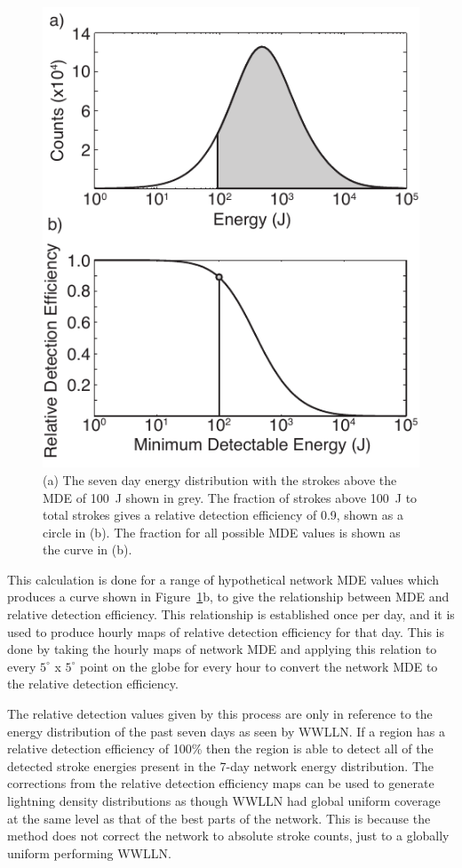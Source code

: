 \begin{figure}[ht!]
   \centering
\noindent\includegraphics[scale=1]{efficiency/Figures/2012RS005049-f5.pdf}
   \caption{(a) The seven day energy distribution with the strokes above the MDE of 100~J shown in grey.
The fraction of strokes above 100~J to total strokes gives a relative detection efficiency of 0.9, shown as a circle in (b).
The fraction for all possible MDE values is shown as the curve in (b).}
   \label{efficiency:fig:Curve}
\end{figure}

This calculation is done for a range of hypothetical network MDE values which produces a curve shown in Figure~\ref{efficiency:fig:Curve}b, to give the relationship between MDE and relative detection efficiency.
This relationship is established once per day, and it is used to produce hourly maps of relative detection efficiency for that day.
This is done by taking the hourly maps of network MDE and applying this relation to every $5^\circ$ x $5^\circ$ point on the globe for every hour to convert the network MDE to the relative detection efficiency.

The relative detection values given by this process are only in reference to the energy distribution of the past seven days as seen by WWLLN.
If a region has a relative detection efficiency of 100\% then the region is able to detect all of the detected stroke energies present in the 7-day network energy distribution.
The corrections from the relative detection efficiency maps can be used to generate lightning density distributions as though WWLLN had global uniform coverage at the same level as that of the best parts of the network.
This is because the method does not correct the network to absolute stroke counts, just to a globally uniform performing WWLLN.

